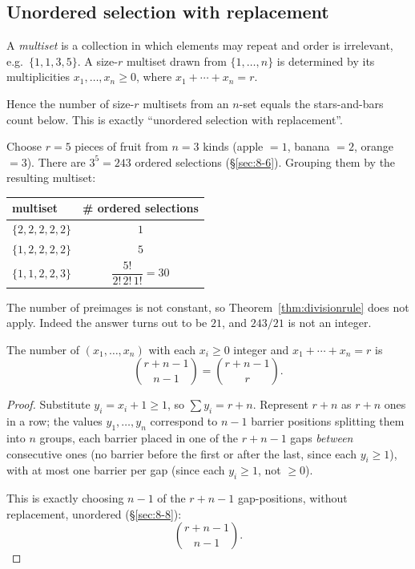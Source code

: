 \subsection{Unordered selection with replacement}
\label{sec:8-9}

\begin{definition}[Multiset]
A \emph{multiset} is a collection in which elements may repeat and order is irrelevant, e.g.\ $\{1,1,3,5\}$. A size-$r$ multiset drawn from $\{1,\dots,n\}$ is determined by its multiplicities $x_1,\dots,x_n\ge0$, where $x_1+\cdots+x_n=r$.
\end{definition}
\begin{note}
Hence the number of size-$r$ multisets from an $n$-set equals the stars-and-bars count below. This is exactly ``unordered selection with replacement''.
\end{note}

\begin{example}
Choose $r=5$ pieces of fruit from $n=3$ kinds (apple $=1$, banana $=2$, orange $=3$). There are $3^5=243$ ordered selections (\S\ref{sec:8-6}). Grouping them by the resulting multiset:
\begin{center}
\begin{tabular}{l|c}
multiset & \# ordered selections \\ \hline
$\{2,2,2,2,2\}$ & $1$ \\
$\{1,2,2,2,2\}$ & $5$ \\
$\{1,1,2,2,3\}$ & $\dfrac{5!}{2!\,2!\,1!}=30$
\end{tabular}
\end{center}
The number of preimages is not constant, so Theorem~\ref{thm:divisionrule} does not apply. Indeed the answer turns out to be $21$, and $243/21$ is not an integer.
\end{example}

\begin{theorem}
The number of $(x_1,\dots,x_n)$ with each $x_i\ge0$ integer and $x_1+\cdots+x_n=r$ is
\[
\binom{r+n-1}{n-1} = \binom{r+n-1}{r}.
\]
\end{theorem}
\begin{proof}
Substitute $y_i=x_i+1\ge1$, so $\sum y_i = r+n$. Represent $r+n$ as $r+n$ ones in a row; the values $y_1,\dots,y_n$ correspond to $n-1$ barrier positions splitting them into $n$ groups, each barrier placed in one of the $r+n-1$ gaps \emph{between} consecutive ones (no barrier before the first or after the last, since each $y_i\ge1$), with at most one barrier per gap (since each $y_i\ge1$, not $\ge0$).

This is exactly choosing $n-1$ of the $r+n-1$ gap-positions, without replacement, unordered (\S\ref{sec:8-8}):
\[
\binom{r+n-1}{n-1}.
\]
\end{proof}

